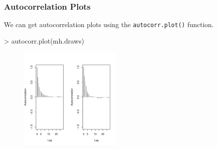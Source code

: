 \documentclass{beamer}
\begin{document}
\begin{frame}

\begin{figure}[!htp]
\begin{center}
\end{center}
\end{figure}
\end{frame}

\begin{frame}[fragile]
\frametitle{Autocorrelation Plots}
\pause
We can get autocorrelation plots using the {\tt autocorr.plot()} function.
\pause
\medskip
\tiny
\begin{Schunk}
\begin{Sinput}
> autocorr.plot(mh.draws)
\end{Sinput}
\end{Schunk}
\begin{figure}[!htp]
\begin{center}
\includegraphics[width=2in, height=2in]{convergence-autocorr.pdf}
\end{center}
\end{figure}
\normalsize
\end{frame}
\end{document}
